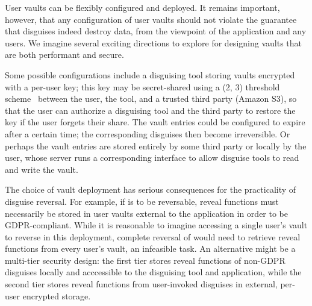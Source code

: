 %
User vaults can be flexibly configured and deployed. It remains important, however, that any
configuration of user vaults should not violate the guarantee that disguises indeed destroy data,
from the viewpoint of the application and any users.
We imagine several exciting directions to explore for designing vaults that are both
performant and secure.
%

%
Some possible configurations include a disguising tool storing vaults encrypted with a per-user key; this key
may be secret-shared using a (2, 3) threshold scheme~\cite{secretsharing} between the user, the
tool, and a trusted third party (\eg Amazon S3), so that the user can authorize a disguising tool and the
third party to restore the key if the user forgets their share.
%
The vault entries could be configured to expire after a certain time; the corresponding disguises
then become irreversible.
%
Or perhaps the vault entries are stored entirely by some third party or locally by the user, whose
server runs a corresponding interface to allow disguise tools to read and write the vault.

The choice of vault deployment has serious consequences for the practicality of disguise reversal.
For example, if \gdpr is to be reversable, reveal functions must necessarily be stored in user vaults external
to the application in order to be GDPR-compliant.
While it is reasonable to imagine accessing a single user's vault to reverse \gdpr in this
deployment, complete reversal of \ca would need to retrieve reveal functions from every user's vault, an infeasible task.
An alternative might be a multi-tier security design: the first tier stores reveal functions of
non-GDPR disguises locally and acccessible to the disguising tool and application, while the second
tier stores reveal functions from user-invoked disguises in external, per-user encrypted storage.

